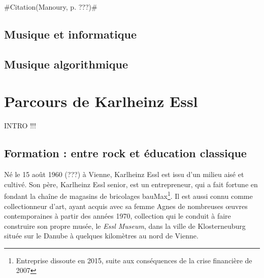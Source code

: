 \documentclass[a4paper,12pt]{article}
\newcommand{\guill}[1]{«~#1~»}
\newcommand{\zitat}[2]{\#Citation(#2)\#}
\begin{document}
\zitat{Les débuts de cette \emph{computer music} nous emmènent donc bien loin d'une expérience du temps réel\dots
Manoury : C'était, en effet, un retour au temps différé. À l'époque où les synthétiseurs commençaient à être utilisés pour les tâches très précises, l'intérêt de l'informatique est rapidement devenu manifeste. Cependant, ce n'est qu'au début des années quatre-vingt qu'ont été conçus les premiers ordinateurs suffisamment rapides pour effectuer les calculs en temps réel --- disons suffisamment rapidement pour que l'oreille ne perçoive pas le temps de calcul. Le prototype le plus connu est la 4X. C'était la première fois que l'on pouvait atteindre un \guill{temps réel} numérique, c'est-à-dire inscriptible sur une matière, et cela ouvrait immédiatement la possibilité d'interagir directement avec le jeu instrumental, de se synchroniser avec lui, d'effectuer les calculs au moment même du concert, avec le son du concert et non plus à partir d'une source figée.}
{Manoury, p. ???}

\subsection*{Musique et informatique}

\subsection{Musique algorithmique}


\section{Parcours de Karlheinz Essl}

INTRO !!!

\subsection{Formation : entre rock et éducation classique}

Né le 15 août 1960 (???) à Vienne, Karlheinz Essl est issu d'un milieu aisé et cultivé. Son père, Karlheinz Essl senior, est un entrepreneur, qui a fait fortune en fondant la chaîne de magasins de bricolages bauMax\footnote{Entreprise dissoute en 2015, suite aux conséquences de la crise financière de 2007}. Il est aussi connu comme collectionneur d'art, ayant acquis avec sa femme Agnes de nombreuses œuvres contemporaines à partir des années 1970, collection qui le conduit à faire construire son propre musée, le \emph{Essl Museum}, dans la ville de Klosterneuburg située sur le Danube à quelques kilomètres au nord de Vienne.
\end{document}
